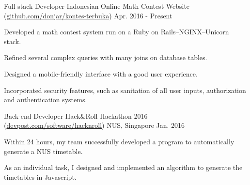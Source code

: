 

\begin{cventries}

	\cventry
	{Full-stack Developer} %
	{Indonesian Online Math Contest Website (\url{github.com/donjar/kontes-terbuka})} %
	{} %
	{Apr. 2016 - Present} %
	{
		\begin{cvitems} %
		\item {Developed a math contest system run on a Ruby on Rails--NGINX--Unicorn stack.}
		\item {Refined several complex queries with many joins on database tables.}
		\item {Designed a mobile-friendly interface with a good user experience.}
		\item {Incorporated security features, such as sanitation of all user inputs, authorization and authentication systems.}
		\end{cvitems}
	}

	\cventry
	{Back-end Developer} %
	{Hack\&Roll Hackathon 2016 (\url{devpost.com/software/hacknroll})} %
	{NUS, Singapore} %
	{Jan. 2016} %
	{
		\begin{cvitems} %
		\item {Within 24 hours, my team successfully developed a program to automatically generate a NUS timetable.}
		\item {As an individual task, I designed and implemented an algorithm to generate the timetables in Javascript.}
		\end{cvitems}
	}


\end{cventries}
